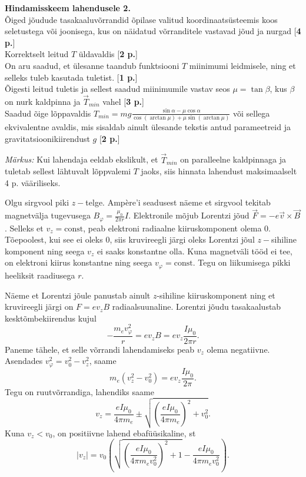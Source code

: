 \documentclass[10pt]{article}
\begin{document}
\textbf{Hindamisskeem lahendusele 2.} \\
Õiged jõudude tasakaaluvõrrandid õpilase valitud koordinaatsüsteemis koos seletustega või joonisega, kus on näidatud võrranditele vastavad jõud ja nurgad [\textbf{4 p.}]\\
Korrektselt leitud $T$ üldavaldis [\textbf{2 p.}]\\
On aru saadud, et ülesanne taandub funktsiooni $T$ miinimumi leidmisele, ning et selleks tuleb kasutada tuletist. [\textbf{1 p.}]\\
Õigesti leitud tuletis ja sellest saadud miinimumile vastav seos $\mu=\tan\beta$, kus $\beta$ on nurk kaldpinna ja $\overrightarrow{T}_{min}$ vahel [\textbf{3 p.}]\\
Saadud õige lõppavaldis $T_{min}=mg\frac{\sin\alpha-\mu\cos\alpha}{\cos(\arctan\mu)+\mu\sin(\arctan\mu)}$ või sellega ekvivalentne avaldis, mis sisaldab ainult ülesande tekstis antud parameetreid
ja gravitatsioonikiirendust $g$ [\textbf{2 p.}]

\emph{Märkus:} Kui lahendaja eeldab ekslikult, et $\overrightarrow{T}_{min}$ on paralleelne kaldpinnaga ja tuletab sellest lähtuvalt lõppvalemi $T$ jaoks, siis hinnata lahendust
maksimaalselt 4 p. vääriliseks.
\probend
\bigskip


\solu
Olgu sirgvool piki $z-$telge. Ampère'i seadusest näeme et sirgvool tekitab magnetvälja tugevusega $B_\varphi = \frac{\mu_0}{2\pi r}I$. Elektronile mõjub Lorentzi jõud $\vec F = -e\vec v \times \vec B$. Selleks et $v_z = \mathrm{const}$, peab elektroni radiaalne kiiruskomponent olema $0$. Tõepoolest, kui see ei oleks 0, siis kruvireegli järgi oleks Lorentzi jõul $z-$sihiline komponent ning seega $v_z$ ei saaks konstantne olla. Kuna magnetväli tööd ei tee, on elektroni kiirus konstantne ning seega $v_\varphi = \mathrm{const}$. Tegu on liikumisega pikki heeliksit raadiusega $r$.

Näeme et Lorentzi jõule panustab ainult $z$-sihiline kiiruskomponent ning et kruvireegli järgi on $F = ev_z B$ radiaalsuunaline. Lorentzi jõudu tasakaalustab kesktõmbekiirendus kujul
\[
-\frac{m_ev_\varphi^2}{r} = ev_z B = ev_z \frac{I \mu_0}{2\pi r}.
\]
Paneme tähele, et selle võrrandi lahendamiseks peab $v_z$ olema negatiivne. Asendades $v_\varphi^2 = v_0^2 - v_z^2$, saame
\[
m_e(v_z^2 - v_0^2) = ev_z \frac{I\mu_0}{2\pi}.
\]
Tegu on ruutvõrrandiga, lahendiks saame
\[
v_z = \frac{e I\mu_0}{4\pi m_e} \pm \sqrt{\left(\frac{e I\mu_0}{4\pi m_e}\right)^2+v_0^2}.
\]
Kuna $v_z < v_0$, on positiivne lahend ebafüüsikaline, st
\[
|v_z| = v_0 \left(\sqrt{\left(\frac{e I\mu_0}{4\pi m_e v_0^2}\right)^2 + 1} - \frac{e I\mu_0}{4\pi m_e v_0^2}\right).
\]
\probend
\bigskip
\end{document}
